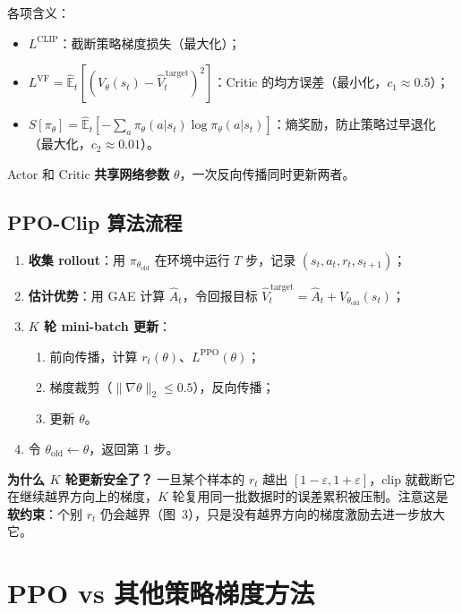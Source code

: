 \documentclass{article}
\begin{document}
各项含义：
\begin{itemize}
  \item $L^{\text{CLIP}}$：截断策略梯度损失（最大化）；
  \item $L^{\text{VF}} = \hat{\mathbb{E}}_t\!\left[\left(V_\theta(s_t) - \hat{V}_t^{\,\text{target}}\right)^2\right]$：Critic 的均方误差（最小化，$c_1 \approx 0.5$）；
  \item $S[\pi_\theta] = \hat{\mathbb{E}}_t\!\left[-\sum_a \pi_\theta(a|s_t)\log\pi_\theta(a|s_t)\right]$：熵奖励，防止策略过早退化（最大化，$c_2 \approx 0.01$）。
\end{itemize}

Actor 和 Critic \textbf{共享网络参数} $\theta$，一次反向传播同时更新两者。

\subsection*{PPO-Clip 算法流程}

\begin{enumerate}
  \item \textbf{收集 rollout}：用 $\pi_{\theta_\text{old}}$ 在环境中运行 $T$ 步，记录 $(s_t, a_t, r_t, s_{t+1})$；
  \item \textbf{估计优势}：用 GAE 计算 $\hat{A}_t$，令回报目标 $\hat{V}_t^{\,\text{target}} = \hat{A}_t + V_{\theta_\text{old}}(s_t)$；
  \item \textbf{$K$ 轮 mini-batch 更新}：
    \begin{enumerate}
      \item 前向传播，计算 $r_t(\theta)$、$L^{\text{PPO}}(\theta)$；
      \item 梯度裁剪（$\|\nabla\theta\|_2 \le 0.5$），反向传播；
      \item 更新 $\theta$。
    \end{enumerate}
  \item 令 $\theta_\text{old} \leftarrow \theta$，返回第 1 步。
\end{enumerate}

\textbf{为什么 $K$ 轮更新安全了？} 一旦某个样本的 $r_t$ 越出 $[1-\varepsilon, 1+\varepsilon]$，clip 就截断它在继续越界方向上的梯度，$K$ 轮复用同一批数据时的误差累积被压制。注意这是\textbf{软约束}：个别 $r_t$ 仍会越界（图~3），只是没有越界方向的梯度激励去进一步放大它。

\section*{PPO vs 其他策略梯度方法}
\end{document}

